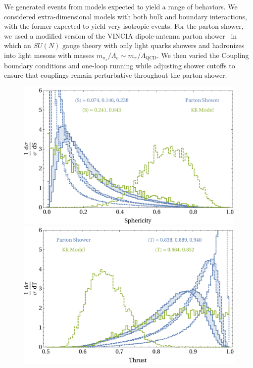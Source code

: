 We generated events from models expected to yield a range of behaviors. We considered extra-dimensional models with both bulk and boundary interactions, with the former expected to yield very isotropic events. For the parton shower, we used a modified version of the VINCIA dipole-antenna parton shower~\cite{Fischer:2016vfv} in which an $SU(N)$ gauge theory with only light quarks showers and hadronizes into light mesons with masses $m_{\pi_v}/\Lambda_v \sim m_\pi/\Lambda_\text{QCD}$. We then varied the Coupling boundary conditions and one-loop running while adjusting shower cutoffs to ensure that couplings remain perturbative throughout the parton shower.

\begin{figure}[tb!]
	\centering
	\includegraphics[width=\textwidth]{figures/DS_comparison_sphericity.pdf}\\
	\vspace{1cm}
	\includegraphics[width=\textwidth]{figures/DS_comparison_thrust.pdf}

\end{figure}
